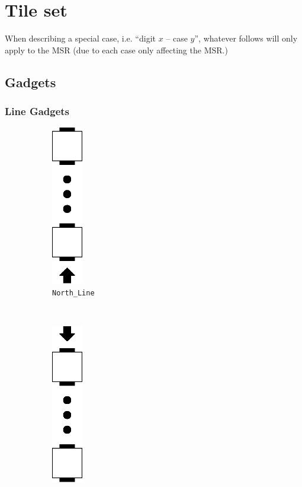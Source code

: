 \section{Tile set}
\label{gadgets}



When describing a special case, i.e. ``digit $x$ -- case $y$'', whatever follows
will only apply to the MSR (due to each case only affecting the MSR.)

\subsection{Gadgets}
\subsubsection{Line Gadgets}
\begin{figure}[H]
    \centering
    \begin{subfigure}[t]{0.15\textwidth}
        \centering
        \includegraphics[width=0.15\textwidth]{north_line}
        \caption{\label{fig:north_line} {\tt North\_Line}}
    \end{subfigure}%
    ~
    \begin{subfigure}[t]{0.15\textwidth}
        \centering
        \includegraphics[width=0.15\textwidth]{south_line}

\end{subfigure}
\end{figure}
